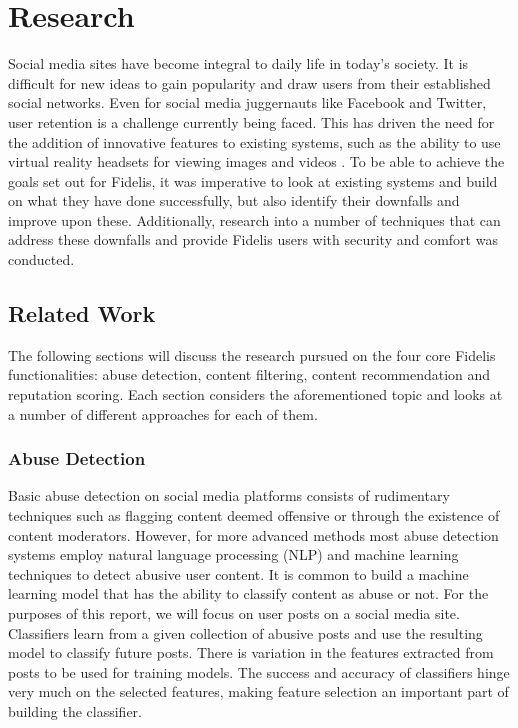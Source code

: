 \chapter{Research}
\label{Chapter:Research}
Social media sites have become integral to daily life in today's society. It is difficult for new ideas to gain popularity and draw users from their established social networks. Even for social media juggernauts like Facebook and Twitter, user retention is a challenge currently being faced. This has driven the need for the addition of innovative features to existing systems, such as the ability to use virtual reality headsets for viewing images and videos \cite{Facebook:VR}. To be able to achieve the goals set out for Fidelis, it was imperative to look at existing systems and build on what they have done successfully, but also identify their downfalls and improve upon these. Additionally, research into a number of techniques that can address these downfalls and provide Fidelis users with security and comfort was conducted.

\section{Related Work}
The following sections will discuss the research pursued on the four core Fidelis functionalities: abuse detection, content filtering, content recommendation and reputation scoring. Each section considers the aforementioned topic and looks at a number of different approaches for each of them.

\subsection{Abuse Detection}
Basic abuse detection on social media platforms consists of rudimentary techniques such as flagging content deemed offensive or through the existence of content moderators. However, for more advanced methods most abuse detection systems employ natural language processing (NLP) and machine learning techniques to detect abusive user content. It is common to build a machine learning model that has the ability to classify content as abuse or not. For the purposes of this report, we will focus on user posts on a social media site. Classifiers learn from a given collection of abusive posts and use the resulting model to classify future posts. There is variation in the features extracted from posts to be used for training models. The success and accuracy of classifiers hinge very much on the selected features, making feature selection an important part of building the classifier.

